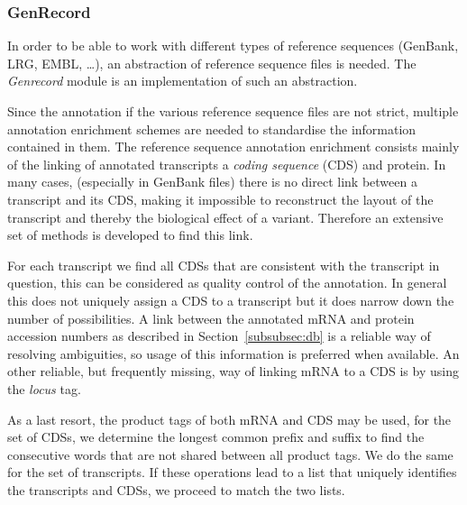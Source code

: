 \documentclass{article}
\begin{document}
\subsubsection{GenRecord} \label{subsubsec:genrecord}
In order to be able to work with different types of reference sequences
(GenBank, LRG, EMBL, \ldots), an abstraction of reference sequence files is
needed. The \emph{Genrecord} module is an implementation of such an
abstraction.

Since the annotation if the various reference sequence files are not strict,
multiple annotation enrichment schemes are needed to standardise the
information contained in them. The reference sequence annotation enrichment
consists mainly of the linking of annotated transcripts a \emph{coding
sequence} (CDS) and protein. In many cases, (especially in GenBank files) there
is no direct link between a transcript and its CDS, making it impossible to
reconstruct the layout of the transcript and thereby the biological effect of a
variant. Therefore an extensive set of methods is developed to find this link.

For each transcript we find all CDSs that are consistent with the transcript in
question, this can be considered as quality control of the annotation. In
general this does not uniquely assign a CDS to a transcript but it does narrow
down the number of possibilities. A link between the annotated mRNA and protein
accession numbers as described in Section~\ref{subsubsec:db} is a reliable way
of resolving ambiguities, so usage of this information is preferred when
available. An other reliable, but frequently missing, way of linking mRNA to a
CDS is by using the \emph{locus} tag.

As a last resort, the product tags of both mRNA and CDS may be used, for the
set of CDSs, we determine the longest common prefix and suffix to find the
consecutive words that are not shared between all product tags. We do the same
for the set of transcripts. If these operations lead to a list that uniquely
identifies the transcripts and CDSs, we proceed to match the two lists.
\end{document}
